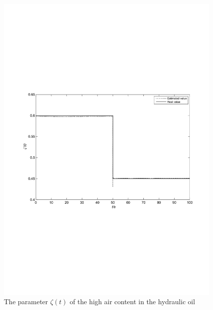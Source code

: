 \documentclass{article}
\begin{document}
\begin{figure}[!htb]
  \centering
  \includegraphics[width=\hsize]{fig4b.pdf}
  \caption{The parameter $\zeta(t)$ of the high air content in the hydraulic oil}
  \label{fig:4b}
\end{figure}
\end{document}

